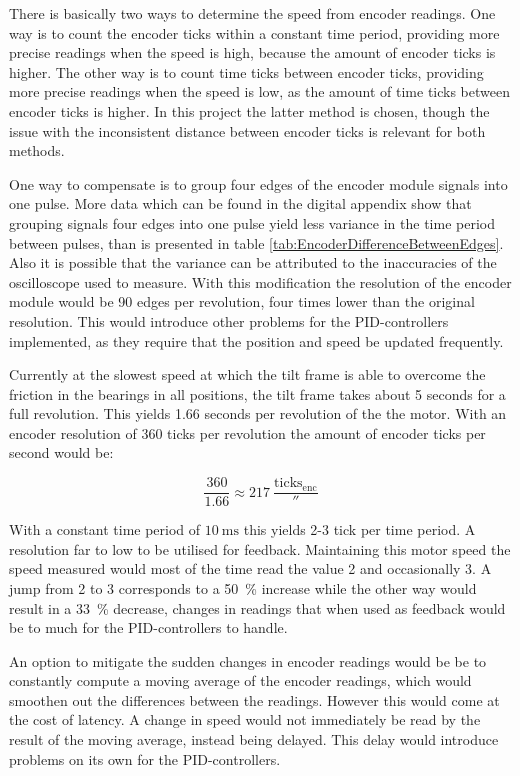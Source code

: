 \documentclass[../../main.tex]{subfiles}
\begin{document}
There is basically two ways to determine the speed from encoder readings. One way is to count the encoder ticks within
a constant time period, providing more precise readings when the speed is high, because the amount of encoder ticks is higher. The other way is to count time ticks between encoder ticks, providing more precise readings when the speed is low, as the amount of time ticks between encoder ticks is higher. In this project the latter method is chosen, though the issue with the inconsistent distance between encoder ticks is relevant for both methods.      

One way to compensate is to group four edges of the encoder module signals into one pulse. More data which can be found in the digital appendix show that grouping signals four edges into one pulse yield less variance in the time period between pulses, than is presented in table \ref{tab:EncoderDifferenceBetweenEdges}. Also it is possible that the variance can be attributed to the inaccuracies of the oscilloscope used to measure. With this modification the resolution of the encoder module would be 90 edges per revolution, four times lower than the original resolution. This would introduce other problems for the PID-controllers implemented, as they require that the position and speed be updated frequently. 

Currently at the slowest speed at which the tilt frame is able to overcome the friction in the bearings in all positions, the tilt frame takes about 5 seconds for a full revolution. This yields 1.66 seconds per revolution of the the motor. With an encoder resolution of 360 ticks per revolution the amount of encoder ticks per second would be: 

\begin{equation}
    \frac{360}{1.66} \approx \SI{ 217 }{ \frac{ \mathrm{ ticks_{enc} } }{ \second } }
\end{equation}

With a constant time period of $\SI{ 10 }{ \milli \second } $ this yields 2-3 tick per time period. A resolution far to low to be utilised for feedback. Maintaining this motor speed the speed measured would most of the time read the value 2 and occasionally 3. A jump from 2 to 3 corresponds to a \SI{50}{\percent} increase while the other way would result in a \SI{33}{\percent} decrease, changes in readings that when used as feedback would be to much for the PID-controllers to handle.

An option to mitigate the sudden changes in encoder readings would be be to constantly compute a moving average of the encoder readings, which would smoothen out the differences between the readings. However this would come at the cost of latency. A change in speed would not immediately be read by the result of the moving average, instead being delayed. This delay would introduce problems on its own for the PID-controllers. 
\end{document}
